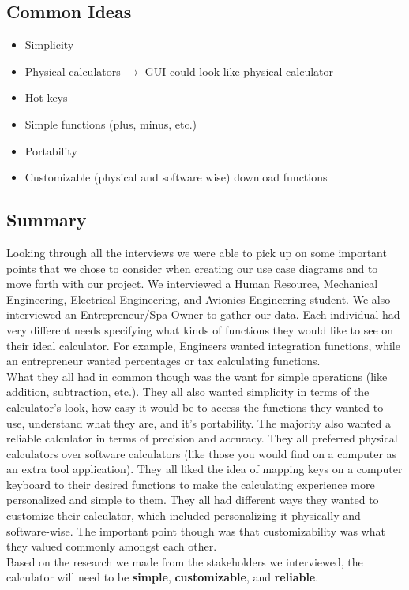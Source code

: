 \documentclass{article}
\begin{document}
\subsection{Common Ideas}
\begin{itemize}
\item Simplicity 
\item Physical calculators $\rightarrow$ GUI could look like physical calculator
\item Hot keys 
\item Simple functions (plus, minus, etc.) 
\item Portability 
\item Customizable (physical and software wise)  download functions 
\end{itemize}

\subsection{Summary}

Looking through all the interviews we were able to pick up on some important points that we chose to consider when creating our use case diagrams and to move forth with our project. We interviewed a Human Resource, Mechanical Engineering, Electrical Engineering, and Avionics Engineering student. We also interviewed an Entrepreneur/Spa Owner to gather our data. Each individual had very different needs specifying what kinds of functions they would like to see on their ideal calculator. For example, Engineers wanted integration functions, while an entrepreneur wanted percentages or tax calculating functions. \\

What they all had in common though was the want for simple operations (like addition, subtraction, etc.). They all also wanted simplicity in terms of the calculator's look, how easy it would be to access the functions they wanted to use, understand what they are, and it’s portability. The majority also wanted a reliable calculator in terms of precision and accuracy. They all preferred physical calculators over software calculators (like those you would find on a computer as an extra tool application). They all liked the idea of mapping keys on a computer keyboard to their desired functions to make the calculating experience more personalized and simple to them. They all had different ways they wanted to customize their calculator, which included personalizing it physically and software-wise. The important point though was that customizability was what they valued commonly amongst each other. \\

Based on the research we made from the stakeholders we interviewed, the calculator will need to be \textbf{simple}, \textbf{customizable}, and \textbf{reliable}.
\end{document}

